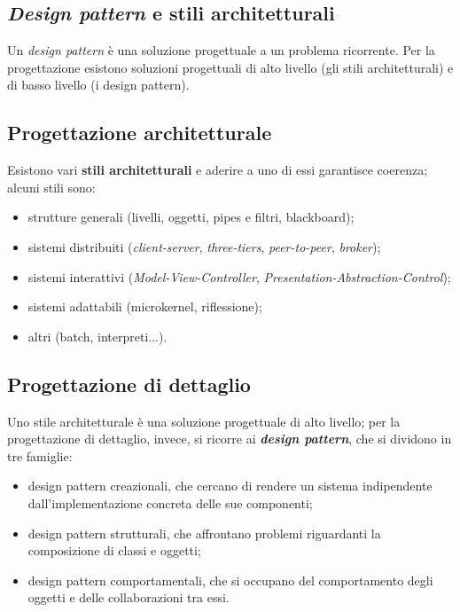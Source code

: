 \documentclass[a4paper]{article}
\begin{document}
		
	\subsection{\emph{Design pattern} e stili architetturali}

		
Un \emph{design pattern} è una soluzione progettuale a un problema ricorrente. Per la progettazione esistono soluzioni progettuali di alto livello (gli stili architetturali) e di basso livello (i design pattern).

		
	\subsection{Progettazione architetturale}

		
Esistono vari \textbf{stili architetturali} e aderire a uno di essi garantisce coerenza; alcuni stili sono:
		
	\begin{itemize}
		
			
	\item strutture generali (livelli, oggetti, pipes e filtri, blackboard);
			
	\item sistemi distribuiti (\emph{client-server}, \emph{three-tiers}, \emph{peer-to-peer}, \emph{broker});
			
	\item sistemi interattivi (\emph{Model-View-Controller}, \emph{Presentation-Abstraction-Control});
			
	\item sistemi adattabili (microkernel, riflessione);
			
	\item altri (batch, interpreti...).
		
	\end{itemize}


		
	\subsection{Progettazione di dettaglio}

		
Uno stile architetturale è una soluzione progettuale di alto livello; per la progettazione di dettaglio, invece, si ricorre ai \textbf{\emph{design pattern}}, che si dividono in tre famiglie:
		
	\begin{itemize}
		
			
	\item design pattern creazionali, che cercano di rendere un sistema indipendente dall'implementazione concreta delle sue componenti;
			
	\item design pattern strutturali, che affrontano problemi riguardanti la composizione di classi e oggetti;
			
	\item design pattern comportamentali, che si occupano del comportamento degli oggetti e delle collaborazioni tra essi.
		
	\end{itemize}
\end{document}
